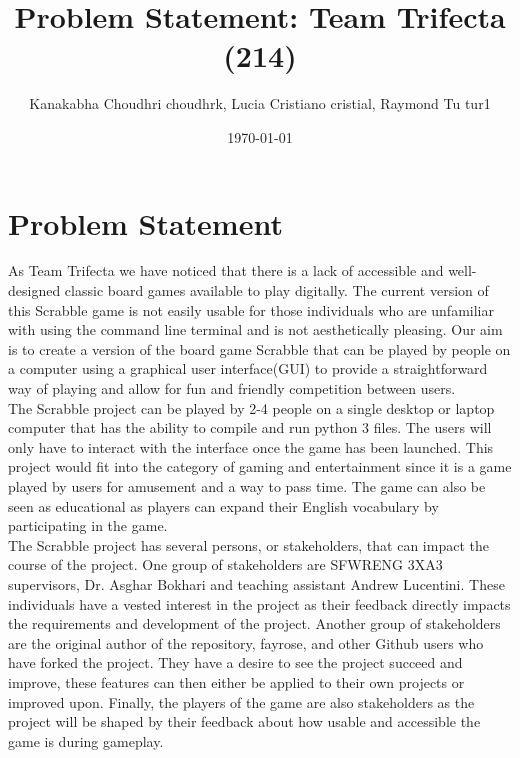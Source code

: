 \documentclass{article}
\title{Problem Statement: Team Trifecta (214)}
\author{Kanakabha Choudhri choudhrk, Lucia Cristiano cristial, Raymond Tu tur1}
\date{\today}
\begin{document}
\maketitle

\section{Problem Statement}
As Team Trifecta we have noticed that there is a lack of accessible and well-designed classic board games available to play digitally. The current version of this Scrabble game is not easily usable for those individuals who are unfamiliar with using the command line terminal and is not aesthetically pleasing. Our aim is to create a version of the board game Scrabble that can be played by people on a computer using a graphical user interface(GUI) to provide a straightforward way of playing and allow for fun and friendly competition between users.\\

The Scrabble project can be played by 2-4 people on a single desktop or laptop computer that has the ability to compile and run python 3 files. The users will only have to interact with the interface once the game has been launched. This project would fit into the category of gaming and entertainment since it is a game played by users for amusement and a way to pass time. The game can also be seen as educational as players can expand their English vocabulary by participating in the game. \\

The Scrabble project has several persons, or stakeholders, that can impact the course of the project. One group of stakeholders are SFWRENG 3XA3 supervisors, Dr. Asghar Bokhari and teaching assistant Andrew Lucentini. These individuals have a vested interest in the project as their feedback directly impacts the requirements and development of the project. Another group of stakeholders are the original author of the repository, fayrose, and other Github users who have forked the project. They have a desire to see the project succeed and improve, these features can then either be applied to their own projects or improved upon. Finally, the players of the game are also stakeholders as the project will be shaped by their feedback about how usable and accessible the game is during gameplay. \\
\end{document}
